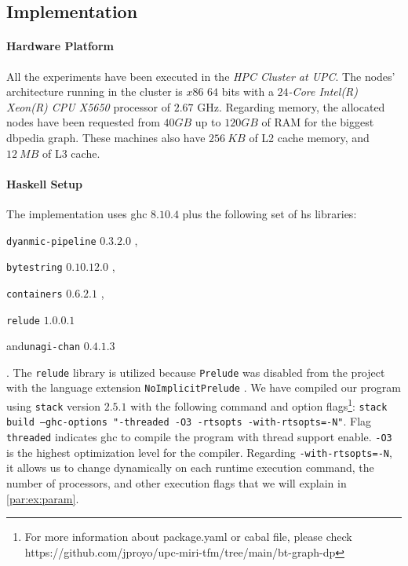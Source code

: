 \subsection{Implementation}
\paragraph{Hardware Platform} All the experiments have been executed in the \emph{HPC Cluster at UPC}. The nodes' architecture running in the cluster is $x86$ $64$ bits with a \textit{$24$-Core Intel(R) Xeon(R) CPU X5650} processor of $2.67$ GHz. 
Regarding memory, the allocated nodes have been requested from $40 GB$ up to $120 GB$ of RAM for the biggest \acrshort{dbpedia} graph. These machines also have $256\ KB$ of L2 cache memory, and $12\ MB$ of L3 cache.

\paragraph{Haskell Setup} The implementation uses \acrshort{ghc} $8.10.4$ plus the following set of \acrshort{hs} libraries:
\begin{inparaenum}[]
  \item \texttt{dyanmic-pipeline} $0.3.2.0$ \cite{dynamic-pipeline},
  \item \texttt{bytestring} $0.10.12.0$ \cite{bytestring},
  \item \texttt{containers} $0.6.2.1$ \cite{containers}, 
  \item\texttt{relude} $1.0.0.1$ \cite{relude}
  \item and\texttt{unagi-chan} $0.4.1.3$ \cite{unagi} 
\end{inparaenum}. The \texttt{relude} library is utilized because \texttt{Prelude} was disabled from the project with the language extension \texttt{NoImplicitPrelude} \cite{extensions}. 
We have compiled our program using \texttt{stack} version $2.5.1$ \cite{stack} with the following command and option flags\footnote{For more information about package.yaml or cabal file, please check https://github.com/jproyo/upc-miri-tfm/tree/main/bt-graph-dp}:
\texttt{stack build --ghc-options "-threaded -O3 -rtsopts -with-rtsopts=-N"}.
Flag \texttt{threaded} indicates \acrshort{ghc} to compile the program with thread support enable. \texttt{-O3} is the highest optimization level for the compiler.
Regarding \texttt{-with-rtsopts=-N}, it allows us to change dynamically on each runtime execution command, the number of processors, and other execution flags that we will explain in \autoref{par:ex:param}. 

